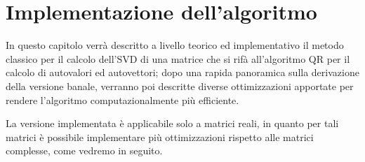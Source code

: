 \chapter{Implementazione dell'algoritmo}
In questo capitolo verrà descritto a livello teorico ed implementativo il metodo 
classico per il calcolo dell'SVD di una matrice che si rifà all'algoritmo QR per 
il calcolo di autovalori ed autovettori; dopo una rapida panoramica sulla 
derivazione della versione banale, verranno poi descritte diverse ottimizzazioni 
apportate per rendere l'algoritmo computazionalmente più efficiente.

La versione implementata è applicabile solo a matrici reali, in quanto per tali 
matrici è possibile implementare più ottimizzazioni rispetto alle matrici 
complesse, come vedremo in seguito.


\newpage

\newpage

\newpage
